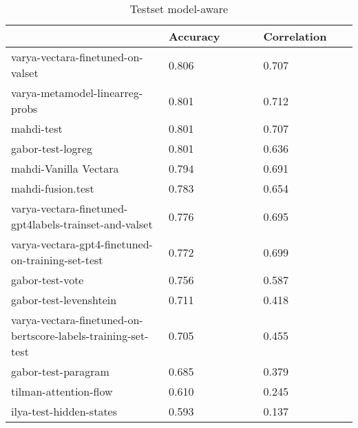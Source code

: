 \begin{table}
\centering
\caption{Testset model-aware}
\label{test-aware}
\begin{tabular}{|p{0.45\linewidth}|R{0.275\linewidth}|R{0.275\linewidth}|}
\hline
 & Accuracy & Correlation \\
\hline
varya-vectara-finetuned-on-valset & 0.806 & 0.707 \\
varya-metamodel-linearreg-probs & 0.801 & 0.712 \\
mahdi-test & 0.801 & 0.707 \\
gabor-test-logreg & 0.801 & 0.636 \\
mahdi-Vanilla Vectara & 0.794 & 0.691 \\
mahdi-fusion.test & 0.783 & 0.654 \\
varya-vectara-finetuned-gpt4labels-trainset-and-valset & 0.776 & 0.695 \\
varya-vectara-gpt4-finetuned-on-training-set-test & 0.772 & 0.699 \\
gabor-test-vote & 0.756 & 0.587 \\
gabor-test-levenshtein & 0.711 & 0.418 \\
varya-vectara-finetuned-on-bertscore-labels-training-set-test & 0.705 & 0.455 \\
gabor-test-paragram & 0.685 & 0.379 \\
tilman-attention-flow & 0.610 & 0.245 \\
ilya-test-hidden-states & 0.593 & 0.137 \\
\hline
\end{tabular}
\end{table}
